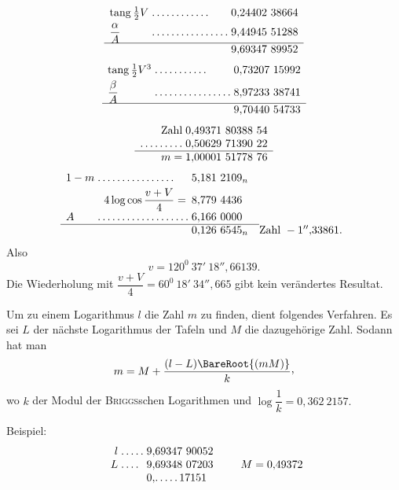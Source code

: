 \[
\begin{array}{l@{\;}l@{\;}l}
\mathrm{tang}\,\tfrac12V & .\,.\,.\,.\,.\,.\,.\,.\,.\,.\,.\,. & 0{,}24402\ 38664\\[3pt]
\dfrac{\alpha}{A} & .\,.\,.\,.\,.\,.\,.\,.\,.\,.\,.\,.\,.\,.\,.\,. & 9{,}44945\ 51288\\[3pt]\hline
&&9{,}69347\ 89952
\end{array}
\]
\[
\begin{array}{l@{\;}l@{\;}l}
\mathrm{tang}\,\tfrac12V^3 & .\,.\,.\,.\,.\,.\,.\,.\,.\,.\,. & 0{,}73207\ 15992\\[3pt]
\dfrac{\beta}{A} & .\,.\,.\,.\,.\,.\,.\,.\,.\,.\,.\,.\,.\,.\,.\,. & 8{,}97233\ 38741\\[3pt]\hline
&&9{,}70440\ 54733
\end{array}
\]
\[
\begin{array}{r@{\;}l}
\text{Zahl}&0{,}49371\ 80388\ 54\\
.\,.\,.\,.\,.\,.\,.\,.\,.&0{,}50629\ 71390\ 22\\\hline
m=&1{,}00001\ 51778\ 76
\end{array}
\]
\[
\begin{array}{l@{\;}l@{\;}l@{\quad}l}
1-m & .\,.\,.\,.\,.\,.\,.\,.\,.\,.\,.\,.\,.\,.\,.\,. &5{,}181\ 2109_n&\\[3pt]
\multicolumn{2}{r}{4\log\cos\dfrac{v+V}{4}=}&8{,}779\ 4436&\\[3pt]
A & .\,.\,.\,.\,.\,.\,.\,.\,.\,.\,.\,.\,.\,.\,.\,.\,.\,.\,.&6{,}166\ 0000&\\\cline{1-3}
&&0{,}126\ 6545_n&\text{Zahl }-1''{,}33861.
\end{array}
\]
Also
\[
v=120^0\ 37'\ 18''{,}66139.
\]
Die Wiederholung mit \(\dfrac{v+V}{4}=60^0\ 18'\ 34''{,}665\) gibt kein verändertes Resultat.
\par
\noindent\hspace*{\parindent}Um zu einem Logarithmus \(l\) die Zahl \(m\) zu finden, dient folgendes Verfahren. Es sei \(L\) der nächste Logarithmus der Tafeln und \(M\) die dazugehörige Zahl. Sodann hat man
\[
m=M+\frac{(l-L)\BareRoot{(mM)}}{k}\mathpunct{\text{\raisebox{.45ex}{,}}}
\]
wo \(k\) der Modul der \textsc{Briggs}schen Logarithmen und \(\log\dfrac1k=0{,}362\ 2157.\)
\par\nobreak
\noindent\hspace*{2\parindent}Beispiel:
\[
\begin{array}{r@{\;}l@{\;}l}
l&.\,.\,.\,.\,.&9{,}69347\ 90052\\
L&.\,.\,.\,.&9{,}69348\ 07203\\
&&0{,}.\,.\,.\,.\,.\,17151
\end{array}
\qquad M=0{,}49372
\]
